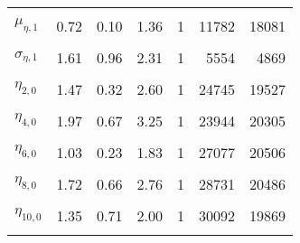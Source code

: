 \begin{longtable}[t]{lrrrrrr}
\endfoot
\bottomrule
\endlastfoot
\cellcolor{gray!6}{$\mu_{\eta, 0}$} & \cellcolor{gray!6}{1.89} & \cellcolor{gray!6}{1.51} & \cellcolor{gray!6}{2.28} & \cellcolor{gray!6}{1} & \cellcolor{gray!6}{14434} & \cellcolor{gray!6}{18892}\\
$\mu_{\eta, 1}$ & 0.72 & 0.10 & 1.36 & 1 & 11782 & 18081\\
\cellcolor{gray!6}{$\sigma_{\eta, 0}$} & \cellcolor{gray!6}{1.07} & \cellcolor{gray!6}{0.74} & \cellcolor{gray!6}{1.43} & \cellcolor{gray!6}{1} & \cellcolor{gray!6}{10210} & \cellcolor{gray!6}{11156}\\
$\sigma_{\eta, 1}$ & 1.61 & 0.96 & 2.31 & 1 & 5554 & 4869\\
\cellcolor{gray!6}{$\eta_{1,  0}$} & \cellcolor{gray!6}{0.58} & \cellcolor{gray!6}{-0.27} & \cellcolor{gray!6}{1.43} & \cellcolor{gray!6}{1} & \cellcolor{gray!6}{26281} & \cellcolor{gray!6}{19156}\\
$\eta_{2,  0}$ & 1.47 & 0.32 & 2.60 & 1 & 24745 & 19527\\
\cellcolor{gray!6}{$\eta_{3,  0}$} & \cellcolor{gray!6}{3.23} & \cellcolor{gray!6}{2.25} & \cellcolor{gray!6}{4.21} & \cellcolor{gray!6}{1} & \cellcolor{gray!6}{14827} & \cellcolor{gray!6}{18305}\\
$\eta_{4,  0}$ & 1.97 & 0.67 & 3.25 & 1 & 23944 & 20305\\
\cellcolor{gray!6}{$\eta_{5,  0}$} & \cellcolor{gray!6}{1.23} & \cellcolor{gray!6}{0.17} & \cellcolor{gray!6}{2.29} & \cellcolor{gray!6}{1} & \cellcolor{gray!6}{21723} & \cellcolor{gray!6}{18811}\\
$\eta_{6,  0}$ & 1.03 & 0.23 & 1.83 & 1 & 27077 & 20506\\
\cellcolor{gray!6}{$\eta_{7,  0}$} & \cellcolor{gray!6}{4.03} & \cellcolor{gray!6}{2.65} & \cellcolor{gray!6}{5.42} & \cellcolor{gray!6}{1} & \cellcolor{gray!6}{13188} & \cellcolor{gray!6}{15171}\\
$\eta_{8,  0}$ & 1.72 & 0.66 & 2.76 & 1 & 28731 & 20486\\
\cellcolor{gray!6}{$\eta_{9,  0}$} & \cellcolor{gray!6}{1.13} & \cellcolor{gray!6}{0.24} & \cellcolor{gray!6}{2.02} & \cellcolor{gray!6}{1} & \cellcolor{gray!6}{32704} & \cellcolor{gray!6}{20594}\\
$\eta_{10,  0}$ & 1.35 & 0.71 & 2.00 & 1 & 30092 & 19869\\
\cellcolor{gray!6}{$\eta_{11,  0}$} & \cellcolor{gray!6}{2.20} & \cellcolor{gray!6}{1.41} & \cellcolor{gray!6}{2.99} & \cellcolor{gray!6}{1} & \cellcolor{gray!6}{26539} & \cellcolor{gray!6}{21003}\\

\end{longtable}
